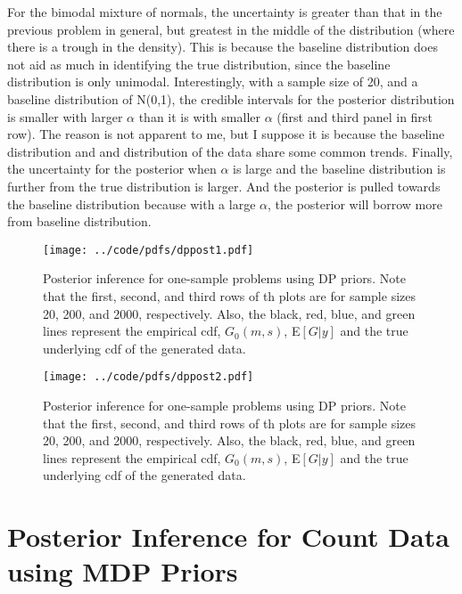 \documentclass{article}
\def\beginmyfig{\begin{figure}[htbp]\begin{center}}
\def\endmyfig{\end{center}\end{figure}}
\begin{document}
\noindent
For the bimodal mixture of normals, the uncertainty is greater than that in the
previous problem in general, but greatest in the middle of the distribution
(where there is a trough in the density). This is because the baseline distribution
does not aid as much in identifying the true distribution, since the baseline distribution
is only unimodal. Interestingly, with a sample size of 20, and a baseline distribution 
of N(0,1), the credible intervals for the posterior distribution is smaller with larger
$\alpha$ than it is with smaller $\alpha$ (first and third panel in first row). The reason 
is not apparent to me, but I suppose it is because the baseline distribution and 
and distribution of the data share some common trends. Finally, the uncertainty for the
posterior when $\alpha$ is large and the baseline distribution is further from the 
true distribution is larger. And the posterior is pulled towards the baseline 
distribution because with a large $\alpha$, the posterior will borrow more from 
baseline distribution. \\

\beginmyfig
  \texttt{[image: ../code/pdfs/dppost1.pdf]}
  \caption{Posterior inference for one-sample problems using 
  DP priors. Note that the first, second, and third rows of th plots are for
  sample sizes 20, 200, and 2000, respectively.  Also, the black, red, blue, and
  green lines represent the empirical cdf, $G_0(m,s)$, E$[G|y]$ and the true
  underlying cdf of the generated data.}
\endmyfig
\beginmyfig
  \texttt{[image: ../code/pdfs/dppost2.pdf]}
  \caption{Posterior inference for one-sample problems using 
  DP priors. Note that the first, second, and third rows of th plots are for
  sample sizes 20, 200, and 2000, respectively.  Also, the black, red, blue, and
  green lines represent the empirical cdf, $G_0(m,s)$, E$[G|y]$ and the true
  underlying cdf of the generated data.}
\endmyfig


\newpage
\section{Posterior Inference for Count Data using MDP Priors}
\end{document}
